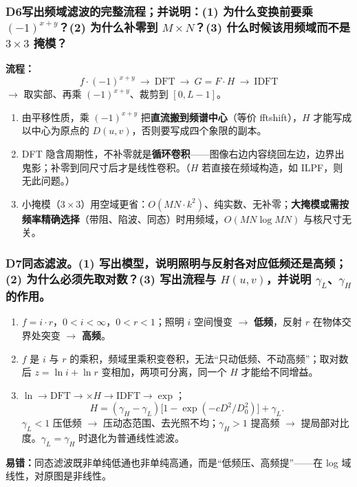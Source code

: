 \subsubsection*{D6\quad 写出频域滤波的完整流程；并说明：(1) 为什么变换前要乘 $(-1)^{x+y}$？(2) 为什么补零到 $M\times N$？(3) 什么时候该用频域而不是 $3\times3$ 掩模？}
\textbf{流程：}
\[
f\cdot(-1)^{x+y}\ \to\ \mathrm{DFT}\ \to\ G=F\cdot H\ \to\ \mathrm{IDFT}
\]
$\to$ 取实部、再乘 $(-1)^{x+y}$、裁剪到 $[0,L-1]$。
\begin{enumerate}[label=(\arabic*),leftmargin=*]
\item 由平移性质，乘 $(-1)^{x+y}$ 把\textbf{直流搬到频谱中心}（等价 fftshift），$H$ 才能写成以中心为原点的 $D(u,v)$，否则要写成四个象限的副本。
\item DFT 隐含周期性，不补零就是\textbf{循环卷积}——图像右边内容绕回左边，边界出鬼影；补零到同尺寸后才是线性卷积。（$H$ 若直接在频域构造，如 ILPF，则无此问题。）
\item 小掩模（$3\times3$）用空域更省：$O(MN\cdot k^2)$、纯实数、无补零；\textbf{大掩模或需按频率精确选择}（带阻、陷波、同态）时用频域，$O(MN\log MN)$ 与核尺寸无关。
\end{enumerate}

\subsubsection*{D7\quad 同态滤波。(1) 写出模型，说明照明与反射各对应低频还是高频；(2) 为什么必须先取对数？(3) 写出流程与 $H(u,v)$，并说明 $\gamma_L$、$\gamma_H$ 的作用。}
\begin{enumerate}[label=(\arabic*),leftmargin=*]
\item $f=i\cdot r$，$0<i<\infty$，$0<r<1$；照明 $i$ 空间慢变 $\to$ \textbf{低频}，反射 $r$ 在物体交界处突变 $\to$ \textbf{高频}。
\item $f$ 是 $i$ 与 $r$ 的乘积，频域里乘积变卷积，无法“只动低频、不动高频”；取对数后 $z=\ln i+\ln r$ 变相加，两项可分离，同一个 $H$ 才能给不同增益。
\item $\ln\to\mathrm{DFT}\to\times H\to\mathrm{IDFT}\to\exp$；
\[
H=(\gamma_H-\gamma_L)\bigl[1-\exp(-cD^2/D_0^2)\bigr]+\gamma_L.
\]
$\gamma_L<1$ 压低频 $\to$ 压动态范围、去光照不均；$\gamma_H>1$ 提高频 $\to$ 提局部对比度。$\gamma_L=\gamma_H$ 时退化为普通线性滤波。
\end{enumerate}
\textbf{易错：}同态滤波既非单纯低通也非单纯高通，而是“低频压、高频提”——在 log 域线性，对原图是非线性。
